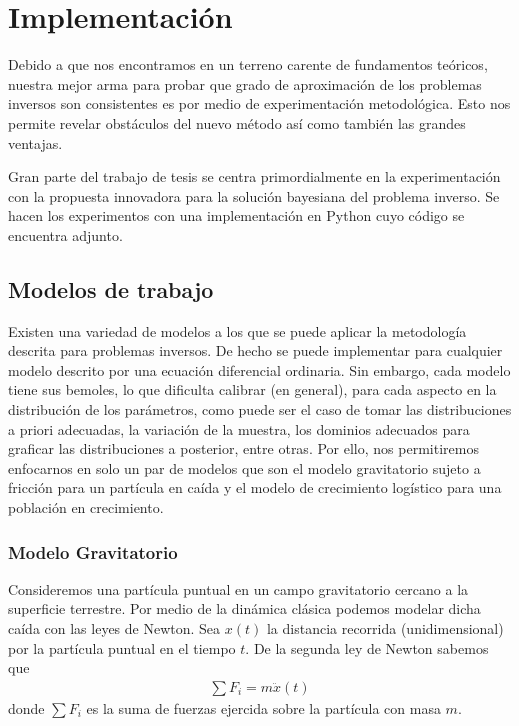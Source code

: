 
\chapter{Implementación} 


Debido a que nos encontramos en un terreno carente de fundamentos teóricos, nuestra mejor arma para probar que grado de aproximación de los problemas inversos son consistentes es por medio de experimentación metodológica. Esto nos permite revelar obstáculos del nuevo método así como también las grandes ventajas. 

Gran parte del trabajo de tesis se centra primordialmente en la experimentación con la propuesta innovadora para la solución bayesiana del problema inverso. Se hacen los experimentos con una implementación en Python cuyo código se encuentra adjunto. 


\section{Modelos de trabajo}

Existen una variedad de modelos a los que se puede aplicar la metodología descrita para problemas inversos. De hecho se puede implementar para cualquier modelo descrito por una ecuación diferencial ordinaria. Sin embargo, cada modelo tiene sus bemoles, lo que dificulta calibrar (en general), para cada aspecto en la distribución de los parámetros, como puede ser el caso de tomar las distribuciones a priori adecuadas, la variación de la muestra, los dominios adecuados para graficar las distribuciones a posterior, entre otras. Por ello, nos permitiremos enfocarnos en solo un par de modelos que son el modelo gravitatorio sujeto a fricción para un partícula en caída y el modelo de crecimiento logístico para una población en crecimiento. 


\subsection{Modelo Gravitatorio}

Consideremos una partícula puntual en un campo gravitatorio cercano a la superficie terrestre. Por medio de la dinámica clásica podemos modelar dicha caída con las leyes de Newton. Sea $x(t)$ la distancia recorrida (unidimensional) por la partícula puntual en el tiempo $t$. De la segunda ley de Newton sabemos que
\begin{align}
    \sum F_i = m\ddot{x}(t) 
    \label{3.1.01}
\end{align}
donde $\sum F_i$ es la suma de fuerzas ejercida sobre la partícula con masa $m$. 

